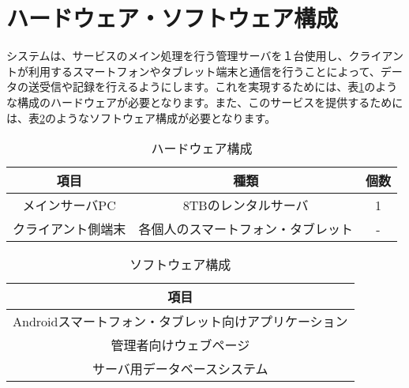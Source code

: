 \documentclass[a4j]{jarticle}
\begin{document}
\section{ハードウェア・ソフトウェア構成}
システムは、サービスのメイン処理を行う管理サーバを１台使用し、クライアントが利用するスマートフォンやタブレット端末と通信を行うことによって、データの送受信や記録を行えるようにします。これを実現するためには、表\ref{tbl: table_hardware}のような構成のハードウェアが必要となります。また、このサービスを提供するためには、表\ref{tbl: table_software}のようなソフトウェア構成が必要となります。

\begin{table}[H]
    \caption{ハードウェア構成}
    \label{tbl: table_hardware}
    \begin{center}
        \begin{tabular}{|c|c|c|} \hline
            項目 & 種類　&  個数\\ \hline
            メインサーバPC & 8TBのレンタルサーバ & 1\\ \hline
            クライアント側端末 & 各個人のスマートフォン・タブレット  & - \\ \hline
        \end{tabular}
    \end{center}
\end{table}


\begin{table}[H]
    \caption{ソフトウェア構成}
    \label{tbl: table_software}
    \begin{center}
        \begin{tabular}{|c|} \hline
            項目 \\ \hline
            Androidスマートフォン・タブレット向けアプリケーション \\ \hline
            管理者向けウェブページ \\ \hline
            サーバ用データベースシステム \\ \hline
        \end{tabular}
    \end{center}
\end{table}
\end{document}
